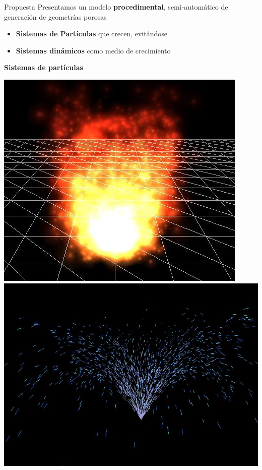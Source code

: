 \documentclass[spanish,unknownkeysallowed,10pt]{beamer}
\begin{document}
\begin{frame}{Propuesta}
Presentamos un modelo \textbf{procedimental}, semi-automático de generación de geometrías porosas
\begin{itemize}
\item \textbf{Sistemas de Partículas} que crecen, evitándose
\item \textbf{Sistemas dinámicos} como medio de crecimiento
\end{itemize}

\vspace{0.4cm}

\textbf{Sistemas de partículas}

\includegraphics[scale = 0.216]{../figures/fire}
\includegraphics[scale = 0.2]{../figures/fireworks}
\end{frame}
\end{document}
